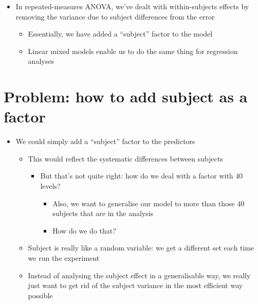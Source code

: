 \documentclass[]{article}
\begin{document}
\begin{itemize}
\itemsep1pt\parskip0pt
\item
  In repeated-measures ANOVA, we've dealt with within-subjects effects
  by removing the variance due to subject differences from the error

  \begin{itemize}
  \itemsep1pt\parskip0pt
  \item
    Essentially, we have added a ``subject'' factor to the model
  \item
    Linear mixed models enable us to do the same thing for regression
    analyses
  \end{itemize}
\end{itemize}

\section{Problem: how to add subject as a
factor}\label{problem-how-to-add-subject-as-a-factor}

\begin{itemize}
\itemsep1pt\parskip0pt
\item
  We could simply add a ``subject'' factor to the predictors

  \begin{itemize}
  \itemsep1pt\parskip0pt
  \item
    This would reflect the systematic differences between subjects

    \begin{itemize}
    \itemsep1pt\parskip0pt
    \item
      But that's not quite right: how do we deal with a factor with 40
      levels?

      \begin{itemize}
      \itemsep1pt\parskip0pt
      \item
        Also, we want to generalise our model to more than those 40
        subjects that are in the analysis
      \item
        How do we do that?
      \end{itemize}
    \end{itemize}
  \item
    Subject is really like a random variable: we get a different set
    each time we run the experiment
  \item
    Instead of analysing the subject effect in a generalisable way, we
    really just want to get rid of the subject variance in the most
    efficient way possible
  \end{itemize}
\end{itemize}
\end{document}
